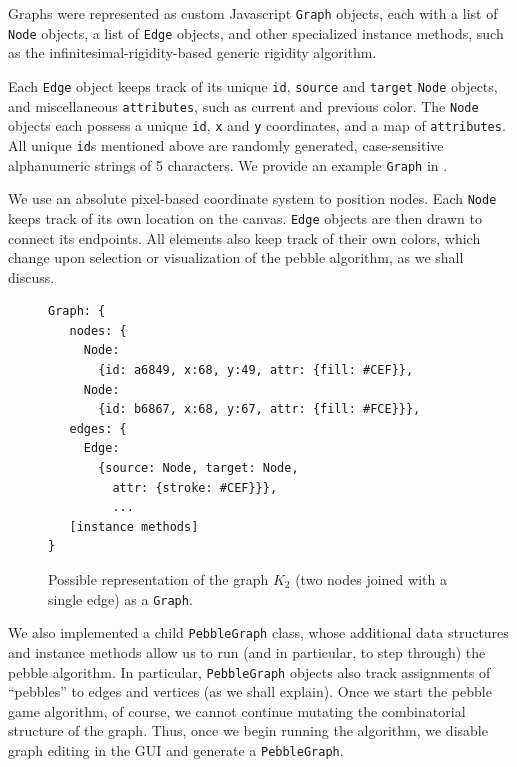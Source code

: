 \documentclass[aps,prd,final,twocolumn,letterpaper,nofootinbib]{revtex4-1}
\begin{document}
Graphs were represented as custom Javascript \texttt{Graph} objects,
each with a list of \texttt{Node} objects,
a list of \texttt{Edge} objects,
and other specialized instance methods,
such as the infinitesimal-rigidity-based generic rigidity algorithm.

Each \texttt{Edge} object keeps track of
its unique \texttt{id},
\texttt{source} and \texttt{target} \texttt{Node} objects,
and miscellaneous \texttt{attributes},
such as current and previous color.
The \texttt{Node} objects
each possess a unique \texttt{id}, \texttt{x} and \texttt{y} coordinates,
and a map of \texttt{attributes}.
All unique \texttt{id}s mentioned above are randomly generated,
case-sensitive alphanumeric strings of 5 characters.
We provide an example \texttt{Graph} in .


We use an absolute pixel-based coordinate system to position nodes.
Each \texttt{Node} keeps track of its own location on the canvas.
\texttt{Edge} objects are then drawn to connect its endpoints.
All elements also keep track of their own colors,
which change upon selection
or visualization of the pebble algorithm,
as we shall discuss.

\begin{figure}[ht]
\begin{verbatim}
Graph: {
   nodes: {
     Node:
       {id: a6849, x:68, y:49, attr: {fill: #CEF}},
     Node:
       {id: b6867, x:68, y:67, attr: {fill: #FCE}}},
   edges: {
     Edge:
       {source: Node, target: Node,
         attr: {stroke: #CEF}}},
         ...
   [instance methods]
}
\end{verbatim}
\caption{Possible representation of the graph $K_2$ (two nodes joined with a single edge) as a \texttt{Graph}.}
\label{fig:graphrep}
\end{figure}

We also implemented a child \texttt{PebbleGraph} class,
whose additional data structures and instance methods
allow us to run (and in particular, to step through) the pebble algorithm.
In particular, \texttt{PebbleGraph} objects also track
assignments of ``pebbles'' to edges and vertices
(as we shall explain).
Once we start the pebble game algorithm,
of course, we cannot continue mutating the combinatorial structure of the graph.
Thus, once we begin running the algorithm,
we disable graph editing in the GUI
and generate a \texttt{PebbleGraph}.
\end{document}
